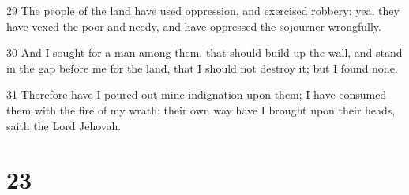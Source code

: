 \par 29 The people of the land have used oppression, and exercised robbery; yea, they have vexed the poor and needy, and have oppressed the sojourner wrongfully.
\par 30 And I sought for a man among them, that should build up the wall, and stand in the gap before me for the land, that I should not destroy it; but I found none.
\par 31 Therefore have I poured out mine indignation upon them; I have consumed them with the fire of my wrath: their own way have I brought upon their heads, saith the Lord Jehovah.

\chapter{23}

